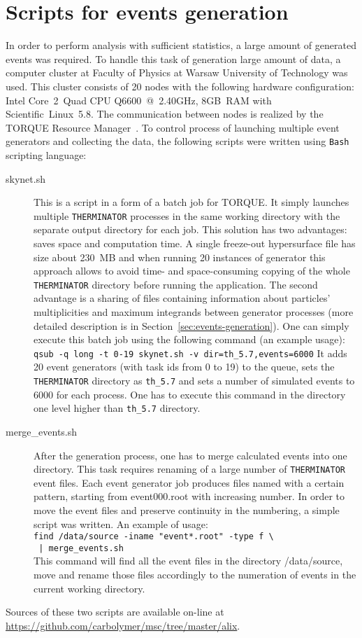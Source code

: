 %
\chapter{Scripts for events generation}
  In order to perform analysis with sufficient statistics, a large amount of generated events was required.
  To handle this task of generation large amount of data, a computer cluster at Faculty of Physics at Warsaw University of Technology was used.
  This cluster consists of 20 nodes with the following hardware configuration: \mbox{Intel\textregistered} \mbox{Core\texttrademark~2 Quad} CPU \mbox{Q6600 @ 2.40GHz,} \mbox{8GB RAM} with Scientific~Linux~5.8.
  The communication between nodes is realized by the TORQUE Resource Manager~\cite{torque}.
  To control process of launching multiple event generators and collecting the data, the following scripts were written using \verb|Bash| scripting language:
  \begin{description}
    \item[skynet.sh] This is a script in a form of a batch job for TORQUE.
      It simply launches multiple \verb|THERMINATOR| processes in the same working directory with the separate output directory for each job.
      This solution has two advantages: saves space and computation time.
      A single freeze-out hypersurface file has size about 230~MB and when running 20 instances of generator this approach allows to avoid time- and space-consuming copying of the whole \verb|THERMINATOR| directory before running the application.
      The second advantage is a sharing of files containing information about particles' multiplicities and maximum integrands between generator processes (more detailed description is in Section~\ref{sec:events-generation}).
      One can simply execute this batch job using the following command (an example usage):
      \\\verb|qsub -q long -t 0-19 skynet.sh -v dir=th_5.7,events=6000|
      It adds 20 event generators (with task ids from 0 to 19) to the queue, sets the \verb|THERMINATOR| directory as \verb|th_5.7| and sets a number of simulated events to 6000 for each process.
      One has to execute this command in the directory one level higher than \verb|th_5.7| directory.
    \item[merge\_events.sh] After the generation process, one has to merge calculated events into one directory.
      This task requires renaming of a large number of \verb|THERMINATOR| event files.
      Each event generator job produces files named with a certain pattern, starting from event000.root with increasing number.
      In order to move the event files and preserve continuity in the numbering, a simple script was written.
      An example of usage:
      \\\verb&find /data/source -iname "event*.root" -type f \ &
      \\\verb& | merge_events.sh&\\
      This command will find all the event files in the directory /data/source, move and rename those files accordingly to the numeration of events in the current working directory.
  \end{description}
  Sources of these two scripts are available on-line at \url{https://github.com/carbolymer/msc/tree/master/alix}.